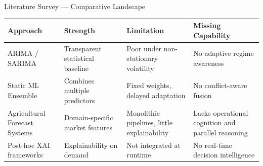 \documentclass[aspectratio=169,10pt]{beamer}
\newenvironment{herocard}[1][0.98\textwidth]{%
  \begin{center}
  \begin{mdframed}[
    linewidth=0.5pt,
    linecolor=borderLight,
    backgroundcolor=bgCard,
    roundcorner=8pt,
    shadow=true,
    shadowsize=4pt,
    shadowcolor=black!6,
    innertopmargin=8pt,
    innerbottommargin=8pt,
    innerleftmargin=12pt,
    innerrightmargin=12pt
  ]
  \begin{minipage}{#1}
}{%
  \end{minipage}
  \end{mdframed}
  \end{center}
}
\begin{document}
\begin{frame}{Literature Survey — Comparative Landscape}
\begin{herocard}
\centering
\scriptsize
\begin{tabular}{p{1.8cm}|p{2.2cm}|p{2.2cm}|p{2.2cm}}
\toprule
\bfseries Approach & \bfseries Strength & \bfseries Limitation & \bfseries Missing Capability \\
\midrule
ARIMA / SARIMA & Transparent statistical baseline & Poor under non-stationary volatility & No adaptive regime awareness \\
\addlinespace
Static ML Ensemble & Combines multiple predictors & Fixed weights, delayed adaptation & No conflict-aware fusion \\
\addlinespace
Agricultural Forecast Systems & Domain-specific market features & Monolithic pipelines, little explainability & Lacks operational cognition and parallel reasoning \\
\addlinespace
Post-hoc XAI frameworks & Explainability on demand & Not integrated at runtime & No real-time decision intelligence \\
\bottomrule
\end{tabular}
\vspace{0.3cm}
\end{herocard}
\end{frame}
\end{document}

